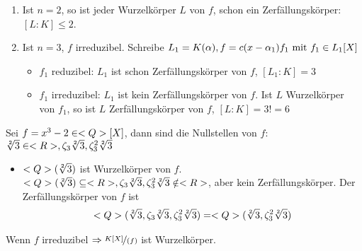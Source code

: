 \begin{example}
	\begin{enumerate}
		\item Ist $n=2$, so ist jeder Wurzelkörper $L$ von $f$, schon ein Zerfällungskörper: $[L:K]\le 2$.
		\item Ist $n =3$, $f$ irreduzibel. Schreibe $L_1 = K(\alpha), f = c(x-\alpha_1)f_1 \mit f_1 \in L_1[X]$
			\begin{itemize}
				\item $f_1$ reduzibel: $L_1$ ist schon Zerfällungskörper von $f$, $[L_1:K] = 3$
				\item $f_1$ irreduzibel: $L_1$ ist kein Zerfällungskörper von $f$. Ist $L$ Wurzelkörper von $f_1$, so ist $L$ Zerfällungskörper von $f$, $[L:K] = 3! = 6$
			\end{itemize}
	\end{enumerate}
\end{example}
\begin{*example}
	Sei $f = x^3 -2 \in \Q[X]$, dann sind die Nullstellen von $f$: $\sqrt[2]{3} \in \R, \zeta_3\sqrt[2]{3}, \zeta_3^2 \sqrt[2]{3}$
	\begin{itemize}
		\item $\Q(\sqrt[2]{3})$ ist Wurzelkörper von $f$. $\Q(\sqrt[2]{3}) \subseteq \R, \zeta_3\sqrt[2]{3}, \zeta_3^2 \sqrt[2]{3} \notin \R$, aber kein Zerfällungskörper. Der Zerfällungskörper von $f$ ist
		\begin{align*}
			\Q(\sqrt[2]{3},\zeta_3\sqrt[2]{3}, \zeta_3^2 \sqrt[2]{3}) = \Q(\sqrt[2]{3}, \zeta_3^2 \sqrt[2]{3})
		\end{align*}
	\end{itemize}
\end{*example}
\begin{*anmerkung}
	Wenn $f$ irreduzibel $\Rightarrow \lnkset{K[X]}{(f)}$ ist Wurzelkörper.
\end{*anmerkung}

